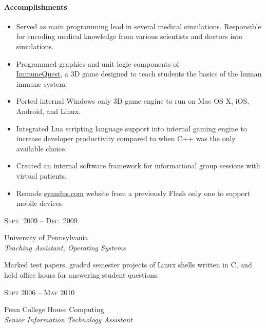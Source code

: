 \documentclass[10pt]{article} %
\begin{document}
{\begin{minipage}[t]{0.5\textwidth}
\paragraph{Accomplishments}
\begin{itemize}
  \setlength\itemsep{0.0em}
  \item Served as main programming lead in several medical simulations. Responsible for encoding medical knowledge from various scientists and doctors into simulations.
  \item Programmed graphics and unit logic components of \\\href{http://immunequest.com}{ImmuneQuest}, a 3D game designed to teach students the basics of the human immune system.
  \item Ported internal Windows only 3D game engine to run on Mac OS X, iOS, Android, and Linux.
  \item Integrated Lua scripting language support into internal gaming engine to increase developer productivity compared to when C++ was the only available choice.
  \item Created an internal software framework for informational group sessions with virtual patients.
  \item Remade \href{http://syandus.com}{syandus.com} website from
    a previously Flash only one to support mobile devices.
\end{itemize}


{\raggedleft\textsc{Sept. 2009 -- Dec. 2009}\par}

{\raggedright\large University of Pennsylvania\\
\textit{Teaching Assistant, Operating Systems}\\[5pt]}

\normalsize{Marked test papers, graded semester projects of Linux shells written in C, and held office hours for answering student questions.}\\


{\raggedleft\textsc{Sept 2006 -- May 2010}\par}

{\raggedright\large Penn College House Computing\\
\textit{Senior Information Technology Assistant}\\[5pt]}


\end{minipage}}
\end{document}
